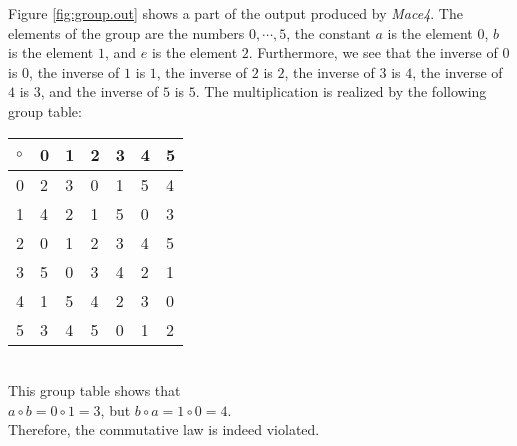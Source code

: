 Figure \ref{fig:group.out} shows a part of the output produced by \textsl{Mace4}. The elements of the group are
the numbers $0, \cdots, 5$, the constant $a$ is the element $0$, $b$ is the element $1$, and $e$ is the element
$2$. Furthermore, we see that the inverse of $0$ is $0$, the inverse of $1$ is $1$, the inverse of $2$ is $2$,
the inverse of $3$ is $4$, the inverse of $4$ is $3$, and the inverse of $5$ is $5$. The multiplication is
realized by the following group table: 
\hspace*{1.3cm}
\begin{tabular}[t]{|l||l|l|l|l|l|l|}
\hline
$\circ$ & 0 & 1 & 2 & 3 & 4 & 5 \\
\hline
\hline
      0 & 2 & 3 & 0 & 1 & 5 & 4 \\
\hline
      1 & 4 & 2 & 1 & 5 & 0 & 3 \\
\hline
      2 & 0 & 1 & 2 & 3 & 4 & 5 \\
\hline
      3 & 5 & 0 & 3 & 4 & 2 & 1 \\
\hline
      4 & 1 & 5 & 4 & 2 & 3 & 0 \\
\hline
      5 & 3 & 4 & 5 & 0 & 1 & 2 \\
\hline
\end{tabular}
\\[0.2cm]
This group table shows that
\\[0.2cm]
\hspace*{1.3cm}
$a \circ b = 0 \circ 1 = 3$, \quad but \quad
$b \circ a = 1 \circ 0 = 4$.
\\[0.2cm]
Therefore, the commutative law is indeed violated.


